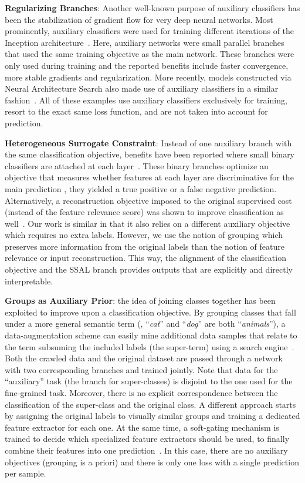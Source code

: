 \documentclass[10pt,twocolumn,letterpaper]{article}
\begin{document}
\textbf{Regularizing Branches}: Another well-known purpose of auxiliary classifiers has been the stabilization of gradient flow for very deep neural networks.
Most prominently, auxiliary classifiers were used for training different iterations of the Inception architecture~\cite{szegedy2016rethinking,szegedy2015going}.
Here, auxiliary networks were small parallel branches that used the same training objective as the main network.
These branches were only used during training and the reported benefits include faster convergence, more stable gradients and regularization.
More recently, models constructed via Neural Architecture Search also made use of auxiliary classifiers in a similar fashion~\cite{zoph2018learning}.
All of these examples use auxiliary classifiers exclusively for training, resort to the exact same loss function, and are not taken into account for prediction.

\textbf{Heterogeneous Surrogate Constraint}: Instead of one auxiliary branch with the same classification objective, benefits have been reported where small binary classifiers are attached at each layer~\cite{lee2015deeply}.
These binary branches optimize an objective that measures whether features at each layer are discriminative for the main prediction \ie, they yielded a true positive or a false negative prediction.
Alternatively, a reconstruction objective imposed to the original supervised cost (instead of the feature relevance score) was shown to improve classification as well~\cite{zhang2016augmenting}.
Our work is similar in that it also relies on a different auxiliary objective which requires no extra labels.
However, we use the notion of grouping which preserves more information from the original labels than the notion of feature relevance or input reconstruction.
This way, the alignment of the classification objective and the SSAL branch provides outputs that are explicitly and directly interpretable.


\textbf{Groups as Auxiliary Prior}: the idea of joining classes together has been exploited to improve upon a classification objective.
By grouping classes that fall under a more general semantic term (\eg, ``\textit{cat}'' and ``\textit{dog}'' are both ``\textit{animals}''), a data-augmentation scheme can easily mine additional data samples that relate to the term subsuming the included labels (the super-term) using a search engine~\cite{xie2015hyper}.
Both the crawled data and the original dataset are passed through a network with two corresponding branches and trained jointly.
Note that data for the ``auxiliary'' task (the branch for super-classes) is disjoint to the one used for the fine-grained task.
Moreover, there is no explicit correspondence between the classification of the super-class and the original class.
A different approach starts by assigning the original labels to visually similar groups and training a dedicated feature extractor for each one.
At the same time, a soft-gating mechanism is trained to decide which specialized feature extractors should be used, to finally combine their features into one prediction~\cite{mullapudi2018hydranets}.
In this case, there are no auxiliary objectives (grouping is a priori) and there is only one loss with a single prediction per sample.
\end{document}
